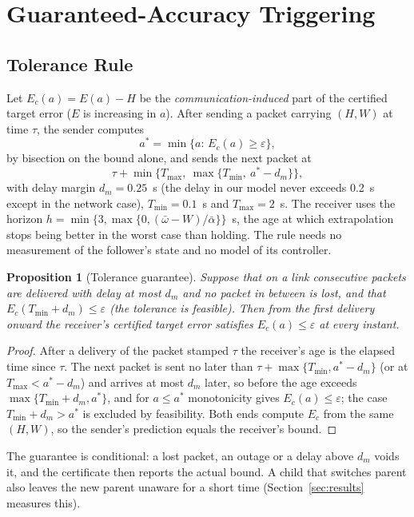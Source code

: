 \documentclass[journal]{IEEEtran}
\newtheorem{proposition}{Proposition}
\begin{document}
\section{Guaranteed-Accuracy Triggering}\label{sec:gat}
\subsection{Tolerance Rule}
Let $E_c(a)=E(a)-H$ be the \emph{communication-induced} part of the certified target error ($E$ is increasing in $a$). After sending a packet carrying $(H,W)$ at time $\tau$, the sender computes
\begin{equation}
a^\ast=\min\{a:\,E_c(a)\ge\varepsilon\},
\end{equation}
by bisection on the bound alone, and sends the next packet at
\begin{equation}
\tau+\min\{T_{\max},\ \max\{T_{\min},\ a^\ast-d_m\}\},
\end{equation}
with delay margin $d_m=0.25$~s (the delay in our model never exceeds 0.2~s except in the network case), $T_{\min}=0.1$~s and $T_{\max}=2$~s. The receiver uses the horizon $h=\min\{3,\max\{0,(\bar\omega-W)/\bar\alpha\}\}$~s, the age at which extrapolation stops being better in the worst case than holding. The rule needs no measurement of the follower's state and no model of its controller.

\begin{proposition}[Tolerance guarantee]\label{prop:gat}
Suppose that on a link consecutive packets are delivered with delay at most $d_m$ and no packet in between is lost, and that $E_c(T_{\min}+d_m)\le\varepsilon$ (the tolerance is feasible). Then from the first delivery onward the receiver's certified target error satisfies $E_c(a)\le\varepsilon$ at every instant.
\end{proposition}
\begin{proof}
After a delivery of the packet stamped $\tau$ the receiver's age is the elapsed time since $\tau$. The next packet is sent no later than $\tau+\max\{T_{\min},a^\ast-d_m\}$ (or at $T_{\max}<a^\ast-d_m$) and arrives at most $d_m$ later, so before the age exceeds $\max\{T_{\min}+d_m,a^\ast\}$, and for $a\le a^\ast$ monotonicity gives $E_c(a)\le\varepsilon$; the case $T_{\min}+d_m>a^\ast$ is excluded by feasibility. Both ends compute $E_c$ from the same $(H,W)$, so the sender's prediction equals the receiver's bound.
\end{proof}
The guarantee is conditional: a lost packet, an outage or a delay above $d_m$ voids it, and the certificate then reports the actual bound. A child that switches parent also leaves the new parent unaware for a short time (Section~\ref{sec:results} measures this).
\end{document}
